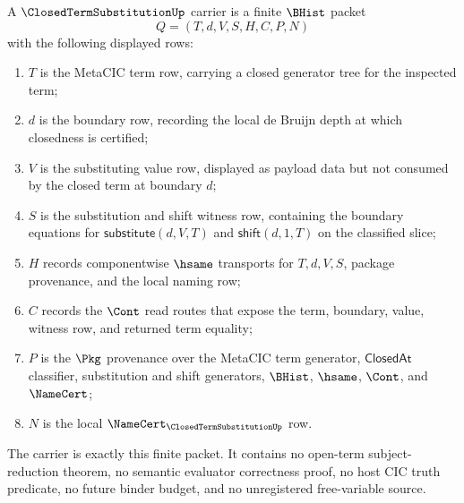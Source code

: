 \begin{definition}
\label{def:closed-term-substitution-carrier}
A $\ClosedTermSubstitutionUp$ carrier is a finite $\BHist$ packet
$$
Q=(T,d,V,S,H,C,P,N)
$$
with the following displayed rows:
\begin{enumerate}
\item $T$ is the MetaCIC term row, carrying a closed generator tree for the inspected term;
\item $d$ is the boundary row, recording the local de Bruijn depth at which closedness is certified;
\item $V$ is the substituting value row, displayed as payload data but not consumed by the closed term at boundary $d$;
\item $S$ is the substitution and shift witness row, containing the boundary equations for $\mathsf{substitute}(d,V,T)$ and $\mathsf{shift}(d,1,T)$ on the classified slice;
\item $H$ records componentwise $\hsame$ transports for $T,d,V,S$, package provenance, and the local naming row;
\item $C$ records the $\Cont$ read routes that expose the term, boundary, value, witness row, and returned term equality;
\item $P$ is the $\Pkg$ provenance over the MetaCIC term generator, $\mathsf{ClosedAt}$ classifier, substitution and shift generators, $\BHist$, $\hsame$, $\Cont$, and $\NameCert$;
\item $N$ is the local $\NameCert_{\ClosedTermSubstitutionUp}$ row.
\end{enumerate}
The carrier is exactly this finite packet. It contains no open-term subject-reduction theorem, no semantic evaluator correctness proof, no host CIC truth predicate, no future binder budget, and no unregistered free-variable source.
\end{definition}

